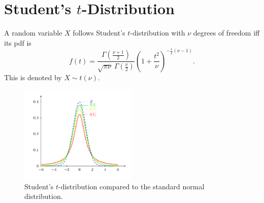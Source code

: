 \section{Student's \(t\)-Distribution}
\begin{definition}{}{}
  A random variable \(X\) follows Student's \(t\)-distribution with \(\nu\) degrees of freedom iff its pdf is
  \[f(t)=\frac{\Gamma{\left( \frac{\nu+1}{2} \right)}}{\sqrt{\pi\nu}\ \Gamma{\left( \frac{\nu}{2} \right)}}\left( 1+\frac{t^2}{\nu} \right)^{-\frac{1}{2}(\nu-1)}.\]
  This is denoted by \(X\sim t(\nu)\).
\end{definition}
\begin{figure}[H]
  \centering
  \includegraphics[width=0.5\textwidth]{../Diagrams/t-distribution/t-distributon.pdf}
  \caption{Student's \(t\)-distribution compared to the standard normal distribution.}
  \label{Fig:Student}
\end{figure}
